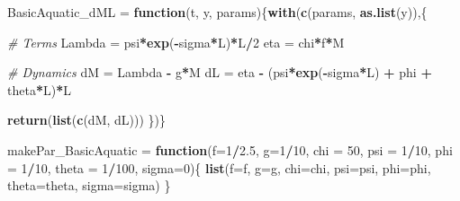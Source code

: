 \documentclass[
]{book}
\newenvironment{Shaded}{\begin{snugshade}}{\end{snugshade}}
\newcommand{\AttributeTok}[1]{\textcolor[rgb]{0.13,0.29,0.53}{#1}}
\newcommand{\CommentTok}[1]{\textcolor[rgb]{0.56,0.35,0.01}{\textit{#1}}}
\newcommand{\ControlFlowTok}[1]{\textcolor[rgb]{0.13,0.29,0.53}{\textbf{#1}}}
\newcommand{\DecValTok}[1]{\textcolor[rgb]{0.00,0.00,0.81}{#1}}
\newcommand{\FloatTok}[1]{\textcolor[rgb]{0.00,0.00,0.81}{#1}}
\newcommand{\FunctionTok}[1]{\textcolor[rgb]{0.13,0.29,0.53}{\textbf{#1}}}
\newcommand{\NormalTok}[1]{#1}
\newcommand{\OtherTok}[1]{\textcolor[rgb]{0.56,0.35,0.01}{#1}}
\newcommand{\SpecialCharTok}[1]{\textcolor[rgb]{0.81,0.36,0.00}{\textbf{#1}}}
\begin{document}
\begin{Shaded}
\begin{Highlighting}[]
\NormalTok{BasicAquatic\_dML }\OtherTok{=} \ControlFlowTok{function}\NormalTok{(t, y, params)\{}\FunctionTok{with}\NormalTok{(}\FunctionTok{c}\NormalTok{(params, }\FunctionTok{as.list}\NormalTok{(y)),\{}
   
  \CommentTok{\# Terms }
\NormalTok{  Lambda }\OtherTok{=}\NormalTok{ psi}\SpecialCharTok{*}\FunctionTok{exp}\NormalTok{(}\SpecialCharTok{{-}}\NormalTok{sigma}\SpecialCharTok{*}\NormalTok{L)}\SpecialCharTok{*}\NormalTok{L}\SpecialCharTok{/}\DecValTok{2} 
\NormalTok{  eta }\OtherTok{=}\NormalTok{ chi}\SpecialCharTok{*}\NormalTok{f}\SpecialCharTok{*}\NormalTok{M }
   
  \CommentTok{\# Dynamics }
\NormalTok{  dM }\OtherTok{=}\NormalTok{ Lambda }\SpecialCharTok{{-}}\NormalTok{ g}\SpecialCharTok{*}\NormalTok{M}
\NormalTok{  dL }\OtherTok{=}\NormalTok{ eta }\SpecialCharTok{{-}}\NormalTok{ (psi}\SpecialCharTok{*}\FunctionTok{exp}\NormalTok{(}\SpecialCharTok{{-}}\NormalTok{sigma}\SpecialCharTok{*}\NormalTok{L) }\SpecialCharTok{+}\NormalTok{ phi }\SpecialCharTok{+}\NormalTok{ theta}\SpecialCharTok{*}\NormalTok{L)}\SpecialCharTok{*}\NormalTok{L }
  
  \FunctionTok{return}\NormalTok{(}\FunctionTok{list}\NormalTok{(}\FunctionTok{c}\NormalTok{(dM, dL)))}
\NormalTok{\})\} }
\end{Highlighting}
\end{Shaded}

\begin{Shaded}
\begin{Highlighting}[]
\NormalTok{makePar\_BasicAquatic }\OtherTok{=} \ControlFlowTok{function}\NormalTok{(}\AttributeTok{f=}\DecValTok{1}\SpecialCharTok{/}\FloatTok{2.5}\NormalTok{, }\AttributeTok{g=}\DecValTok{1}\SpecialCharTok{/}\DecValTok{10}\NormalTok{, }\AttributeTok{chi =} \DecValTok{50}\NormalTok{, }\AttributeTok{psi =} \DecValTok{1}\SpecialCharTok{/}\DecValTok{10}\NormalTok{, }\AttributeTok{phi =} \DecValTok{1}\SpecialCharTok{/}\DecValTok{10}\NormalTok{, }\AttributeTok{theta =} \DecValTok{1}\SpecialCharTok{/}\DecValTok{100}\NormalTok{, }\AttributeTok{sigma=}\DecValTok{0}\NormalTok{)\{}
  \FunctionTok{list}\NormalTok{(}\AttributeTok{f=}\NormalTok{f, }\AttributeTok{g=}\NormalTok{g, }\AttributeTok{chi=}\NormalTok{chi, }\AttributeTok{psi=}\NormalTok{psi, }\AttributeTok{phi=}\NormalTok{phi, }\AttributeTok{theta=}\NormalTok{theta, }\AttributeTok{sigma=}\NormalTok{sigma)}
\NormalTok{\}}
\end{Highlighting}
\end{Shaded}
\end{document}
